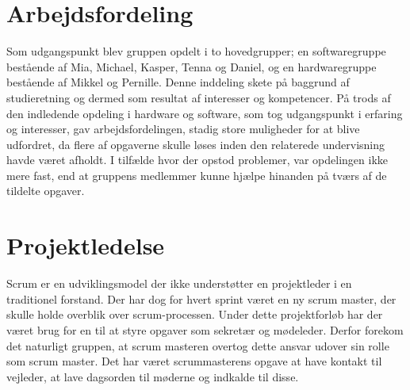 \section{Arbejdsfordeling}
Som udgangspunkt blev gruppen opdelt i to hovedgrupper; en softwaregruppe bestående af Mia, Michael, Kasper, Tenna og Daniel, og en hardwaregruppe bestående af Mikkel og Pernille. Denne inddeling skete på baggrund af studieretning og dermed som resultat af interesser og kompetencer. På trods af den indledende opdeling i hardware og software, som tog udgangspunkt i erfaring og interesser, gav arbejdsfordelingen, stadig store muligheder for at blive udfordret, da flere af opgaverne skulle løses inden den relaterede undervisning havde været afholdt. I tilfælde hvor der opstod problemer, var opdelingen ikke mere fast, end at gruppens medlemmer kunne hjælpe hinanden på tværs af de tildelte opgaver. \\


\section{Projektledelse}
Scrum er en udviklingsmodel der ikke understøtter en projektleder i en traditionel forstand. Der har dog for hvert sprint været en ny scrum master, der skulle holde overblik over scrum-processen. Under dette projektforløb har der været brug for en til at styre opgaver som sekretær og mødeleder. Derfor forekom det naturligt gruppen, at scrum masteren overtog dette ansvar udover sin rolle som scrum master. Det har været scrummasterens opgave at have kontakt til vejleder, at lave dagsorden til møderne og indkalde til disse.  


